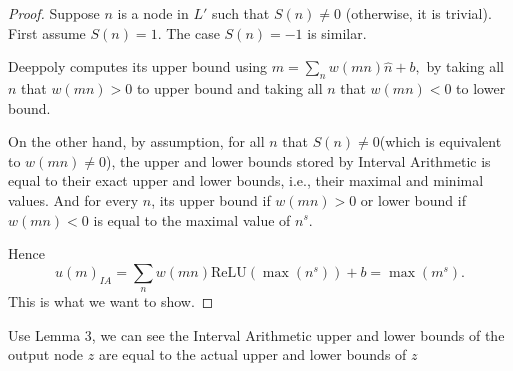 \documentclass[]{article}
\theoremstyle{definition}
\newcommand{\ReLU}{\mathrm{ReLU}}
\begin{document}
\begin{proof}
	Suppose $n$ is a node in $L'$ such that $S(n)\neq 0$ (otherwise, it is trivial). 
	First assume $S(n)=1$. The case $S(n)=-1$ is similar. 

	Deeppoly computes its upper bound using $m=\sum_{n}w(mn)\hat{n}+b,$ by taking all $n$ that $w(mn)>0$ to upper bound and taking all $n$ that $w(mn)<0$ to lower bound.
	
	On the other hand, by assumption, for all $n$ that $S(n)\neq 0$(which is equivalent to $w(mn)\neq 0$), the upper and lower bounds stored by Interval Arithmetic is equal to their exact upper and lower bounds, i.e., their maximal and minimal values. And for every $n$, its upper bound if $w(mn)>0$ or lower bound if $w(mn)<0$ is equal to the maximal value of $n^s$. 
	
	Hence $$u(m)_{IA}=\sum_{n}w(mn)\ReLU(\max(n^s))+b=\max(m^s).$$ This is what we want to show.
\end{proof}

Use Lemma 3, we can see the Interval Arithmetic upper and lower bounds of the output node $z$ are equal to the actual upper and lower bounds of $z$
\end{document}
